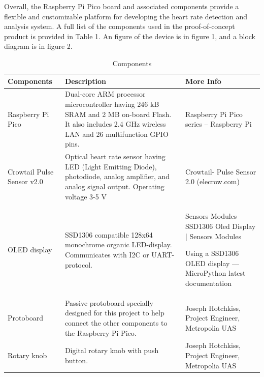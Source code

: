\documentclass{article}
\begin{document}
Overall, the Raspberry Pi Pico board and associated components provide a flexible and customizable platform for developing the heart rate detection and analysis system. A full list of the components used in the proof-of-concept product is provided in Table 1. An figure of the device is in figure 1, and a block diagram is in figure 2.


\begin{table}[h]
\centering
\begin{tabular}{|p{2cm}|p{5.5cm}|p{4cm}|}
\hline
\textbf{Components} & \textbf{Description} & \textbf{More Info} \\ \hline
Raspberry Pi Pico & Dual-core ARM processor microcontroller having 246 kB SRAM and 2 MB on-board Flash. It also includes 2.4 GHz wireless LAN and 26 multifunction GPIO pins.    & Raspberry Pi Pico series – Raspberry Pi    \\ \hline
Crowtail Pulse Sensor v2.0   & Optical heart rate sensor having LED (Light Emitting Diode), photodiode, analog amplifier, and analog signal output. Operating voltage 3-5 V  & Crowtail- Pulse Sensor 2.0 (elecrow.com)   \\ \hline
OLED display   & SSD1306 compatible 128x64 monochrome organic LED-display. Communicates with I2C or UART-protocol.    & Sensors Modules SSD1306 Oled Display | Sensors Modules

Using a SSD1306 OLED display — MicroPython latest documentation    \\ \hline
Protoboard   & Passive protoboard specially designed for this project to help connect the other components to the Raspberry Pi Pico.   & Joseph Hotchkiss, Project Engineer, Metropolia UAS   \\ \hline
Rotary knob  & Digital rotary knob with push button.    & Joseph Hotchkiss, Project Engineer, Metropolia UAS   \\ \hline
\end{tabular}
\caption{Components}
\label{table:version-history}
\end{table}
\end{document}
